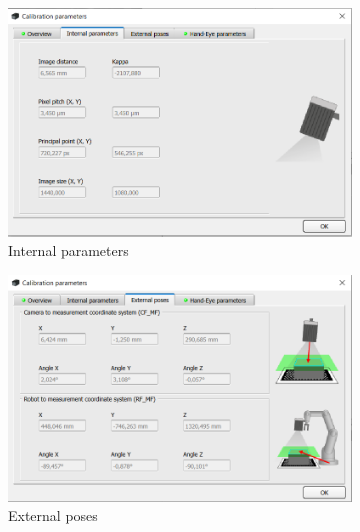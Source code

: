 \begin{figure}[h]
    \centering
    \begin{subfigure}{0.48\textwidth}
        \centering
        \includegraphics[width=\textwidth]{figures/001calibration/internal_parameters.PNG}
        \caption{Internal parameters}
        \label{subfig:internal-parameters}
    \end{subfigure}\hspace{0cm}
    \begin{subfigure}{0.48\textwidth}
        \centering
        \includegraphics[width=\textwidth]{figures/001calibration/external_poses.PNG}
        \caption{External poses}
        \label{subfig:external-poses}
    \end{subfigure}
    \begin{subfigure}{0.48\textwidth}
        \centering

\end{subfigure}
\end{figure}
